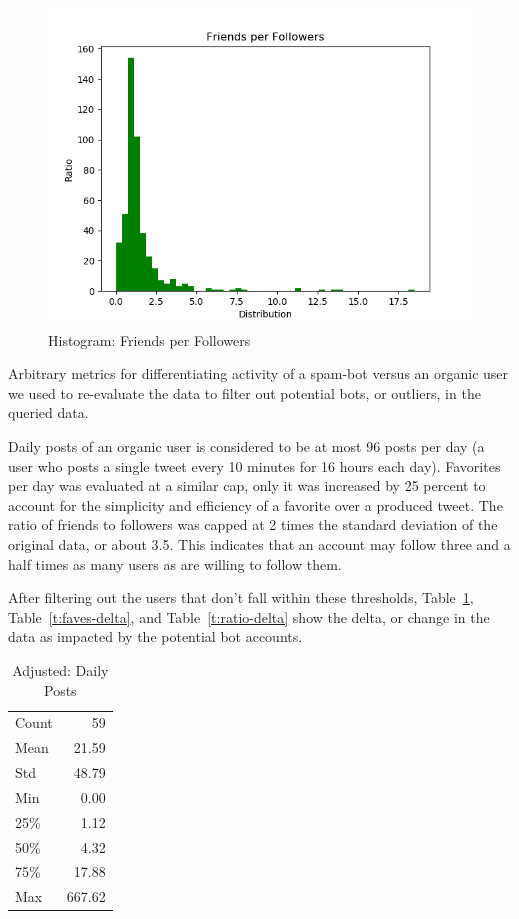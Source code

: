 \begin{figure}[!ht]
  \centering\includegraphics[width=\columnwidth]{images/ratio_hist.png}
  \caption{Histogram: Friends per Followers}\label{f:ratio-hist}
\end{figure}

Arbitrary metrics for differentiating activity of a spam-bot versus an organic
user we used to re-evaluate the data to filter out potential bots, or outliers,
in the queried data.

Daily posts of an organic user is considered to be at most 96 posts per day (a
user who posts a single tweet every 10 minutes for 16 hours each day).
Favorites per day was evaluated at a similar cap, only it was increased by 25
percent to account for the simplicity and efficiency of a favorite over a
produced tweet.  The ratio of friends to followers was capped at 2 times the
standard deviation of the original data, or about 3.5. This indicates that an
account may follow three and a half times as many users as are willing to
follow them. 

After filtering out the users that don't fall within these thresholds,
Table~\ref{t:post-delta}, Table~\ref{t:faves-delta}, and
Table~\ref{t:ratio-delta} show the delta, or change in the data as impacted by
the potential bot accounts.

\begin{table}[htb]
\centering
\caption{Adjusted: Daily Posts}
\label{t:post-delta}
\begin{tabular}{lr}
Count & 59  \\
Mean  & 21.59  \\
Std   & 48.79  \\
Min   & 0.00   \\
25\%  & 1.12   \\
50\%  & 4.32   \\
75\%  & 17.88  \\
Max   & 667.62
\end{tabular}
\end{table}


